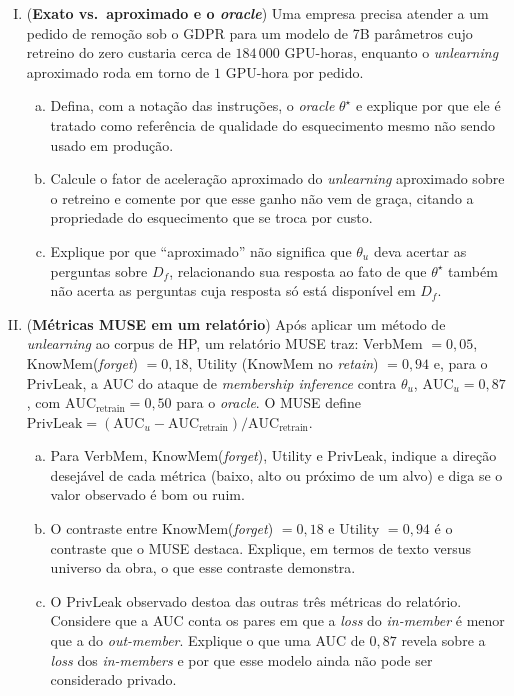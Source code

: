 \documentclass{dlproblemset}
\begin{document}
\begin{enumerate}[I)]

    \item (\textbf{Exato vs.\ aproximado e o \textit{oracle}}) Uma empresa precisa atender a um pedido de remoção sob o GDPR para um modelo de 7B parâmetros cujo retreino do zero custaria cerca de $184\,000$ GPU-horas, enquanto o \textit{unlearning} aproximado roda em torno de $1$ GPU-hora por pedido.
    \begin{enumerate}[(a)]
        \item Defina, com a notação das instruções, o \textit{oracle} $\theta^\star$ e explique por que ele é tratado como referência de qualidade do esquecimento mesmo não sendo usado em produção.
        \item Calcule o fator de aceleração aproximado do \textit{unlearning} aproximado sobre o retreino e comente por que esse ganho não vem de graça, citando a propriedade do esquecimento que se troca por custo.
        \item Explique por que ``aproximado'' não significa que $\theta_u$ deva acertar as perguntas sobre $D_f$, relacionando sua resposta ao fato de que $\theta^\star$ também não acerta as perguntas cuja resposta só está disponível em $D_f$.
    \end{enumerate}

    \item {} (\textbf{Métricas MUSE em um relatório}) Após aplicar um método de \textit{unlearning} ao corpus de HP, um relatório MUSE traz: VerbMem $= 0{,}05$, KnowMem(\textit{forget}) $= 0{,}18$, Utility (KnowMem no \textit{retain}) $= 0{,}94$ e, para o PrivLeak, a AUC do ataque de \textit{membership inference} contra $\theta_u$, $\mathrm{AUC}_u = 0{,}87$, com $\mathrm{AUC}_{\text{retrain}} = 0{,}50$ para o \textit{oracle}. O MUSE define $\text{PrivLeak} = (\mathrm{AUC}_u - \mathrm{AUC}_{\text{retrain}})/\mathrm{AUC}_{\text{retrain}}$.
    \begin{enumerate}[(a)]
        \item Para VerbMem, KnowMem(\textit{forget}), Utility e PrivLeak, indique a direção desejável de cada métrica (baixo, alto ou próximo de um alvo) e diga se o valor observado é bom ou ruim.
        \item O contraste entre KnowMem(\textit{forget}) $= 0{,}18$ e Utility $= 0{,}94$ é o contraste que o MUSE destaca. Explique, em termos de texto versus universo da obra, o que esse contraste demonstra.
        \item O PrivLeak observado destoa das outras três métricas do relatório. Considere que a AUC conta os pares em que a \textit{loss} do \textit{in-member} é menor que a do \textit{out-member}. Explique o que uma AUC de $0{,}87$ revela sobre a \textit{loss} dos \textit{in-members} e por que esse modelo ainda não pode ser considerado privado.
    \end{enumerate}


\end{enumerate}
\end{document}
